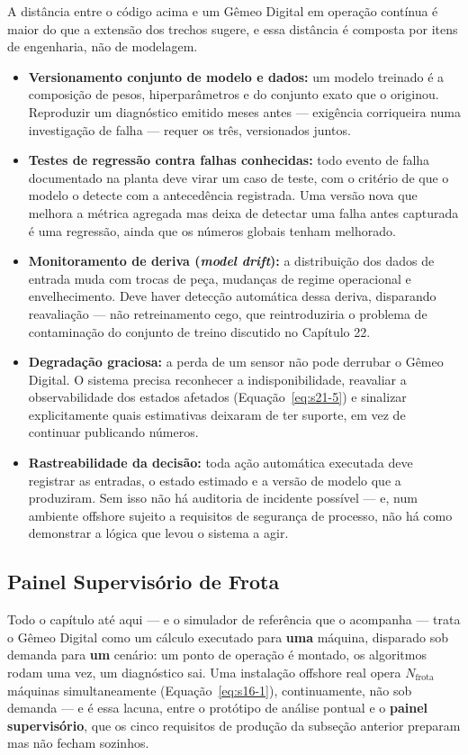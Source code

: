 \documentclass[12pt,a4paper]{article}
\numberwithin{equation}{section}
\numberwithin{table}{section}
\numberwithin{figure}{section}
\begin{document}
	A distância entre o código acima e um Gêmeo Digital em operação contínua é maior do que a extensão dos trechos sugere, e essa distância é composta por itens de engenharia, não de modelagem.

	\begin{itemize}
		\item \textbf{Versionamento conjunto de modelo e dados:} um modelo treinado é a composição de pesos, hiperparâmetros e do conjunto exato que o originou. Reproduzir um diagnóstico emitido meses antes — exigência corriqueira numa investigação de falha — requer os três, versionados juntos.
		\item \textbf{Testes de regressão contra falhas conhecidas:} todo evento de falha documentado na planta deve virar um caso de teste, com o critério de que o modelo o detecte com a antecedência registrada. Uma versão nova que melhora a métrica agregada mas deixa de detectar uma falha antes capturada é uma regressão, ainda que os números globais tenham melhorado.
		\item \textbf{Monitoramento de deriva (\textit{model drift}):} a distribuição dos dados de entrada muda com trocas de peça, mudanças de regime operacional e envelhecimento. Deve haver detecção automática dessa deriva, disparando reavaliação — não retreinamento cego, que reintroduziria o problema de contaminação do conjunto de treino discutido no Capítulo 22.
		\item \textbf{Degradação graciosa:} a perda de um sensor não pode derrubar o Gêmeo Digital. O sistema precisa reconhecer a indisponibilidade, reavaliar a observabilidade dos estados afetados (Equação~\eqref{eq:s21-5}) e sinalizar explicitamente quais estimativas deixaram de ter suporte, em vez de continuar publicando números.
		\item \textbf{Rastreabilidade da decisão:} toda ação automática executada deve registrar as entradas, o estado estimado e a versão de modelo que a produziram. Sem isso não há auditoria de incidente possível — e, num ambiente offshore sujeito a requisitos de segurança de processo, não há como demonstrar a lógica que levou o sistema a agir.
	\end{itemize}

	\subsection{Painel Supervisório de Frota}

	Todo o capítulo até aqui — e o simulador de referência que o acompanha — trata o Gêmeo Digital como um cálculo executado para \textbf{uma} máquina, disparado sob demanda para \textbf{um} cenário: um ponto de operação é montado, os algoritmos rodam uma vez, um diagnóstico sai. Uma instalação offshore real opera $N_{\text{frota}}$ máquinas simultaneamente (Equação~\eqref{eq:s16-1}), continuamente, não sob demanda — e é essa lacuna, entre o protótipo de análise pontual e o \textbf{painel supervisório}, que os cinco requisitos de produção da subseção anterior preparam mas não fecham sozinhos.
\end{document}
